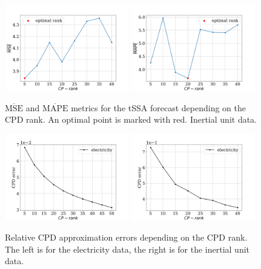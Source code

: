\documentclass[referee, pdflatex, sn-mathphys-num]{sn-jnl}
\theoremstyle{definition}
\theoremstyle{plain}
\begin{document}
	\begin{figure}[h]
		\centering
		\includegraphics[width=0.48\textwidth, keepaspectratio]{pred_MSE_rank_motion.png}
		\includegraphics[width=0.48\textwidth, keepaspectratio]{pred_MAPE_rank_motion.png}
		\caption{$ \overline{\text{MSE}} $ and $ \overline{\text{MAPE}} $ metrics for the tSSA forecast depending on the CPD rank. An optimal point is marked with red. Inertial unit data.}\label{fig:mse_mape_motion}
	\end{figure}
	
	\begin{figure}[h]
		\centering
		\includegraphics[width=0.48\textwidth, keepaspectratio]{CPD_error_elec.png}
		\includegraphics[width=0.48\textwidth, keepaspectratio]{CPD_error_motion.png}
		\caption{Relative CPD approximation errors depending on the CPD rank. The left is for the electricity data, the right is for the inertial unit data.}\label{fig:cpd_errors}
	\end{figure}
	
\end{document}
